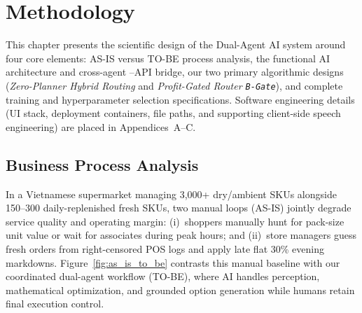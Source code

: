 \chapter{Methodology}

This chapter presents the scientific design of the Dual-Agent AI system around four core elements: AS-IS versus TO-BE process analysis, the functional AI architecture and cross-agent --API bridge, our two primary algorithmic designs (\emph{Zero-Planner Hybrid Routing} and \emph{Profit-Gated Router \texttt{B-Gate}}), and complete training and hyperparameter selection specifications. Software engineering details (UI stack, deployment containers, file paths, and supporting client-side speech engineering) are placed in Appendices~A--C.

\section{Business Process Analysis}

In a Vietnamese supermarket managing 3,000+ dry/ambient SKUs alongside 150--300 daily-replenished fresh SKUs, two manual loops (AS-IS) jointly degrade service quality and operating margin: (i)~shoppers manually hunt for pack-size unit value or wait for associates during peak hours; and (ii)~store managers guess fresh orders from right-censored POS logs and apply late flat 30\% evening markdowns. Figure~\ref{fig:as_is_to_be} contrasts this manual baseline with our coordinated dual-agent workflow (TO-BE), where AI handles perception, mathematical optimization, and grounded option generation while humans retain final execution control.

